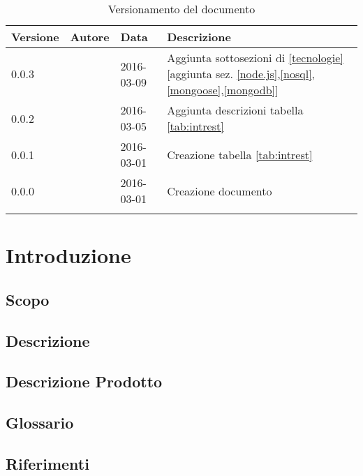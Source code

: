 \documentclass[12pt,a4paper]{article}
\begin{document}
\begin{center}
	\begin{longtable}[H]{p{} p{} p{} p{}}
		\toprule
		\textbf{Versione}	&	\textbf{Autore}	&	\textbf{Data}	&	\textbf{Descrizione}\\*
		\midrule
		\midrule
		0.0.3 & \AVE{} & 2016-03-09 & Aggiunta sottosezioni di \ref{tecnologie} [aggiunta sez. \ref{node.js},\ref{nosql},\ref{mongoose},\ref{mongodb}]  \\*
		\midrule
		0.0.2 & \AVI{} & 2016-03-05 &  Aggiunta descrizioni tabella \ref{tab:intrest} \\*
		\midrule
		0.0.1 & \NDC{} & 2016-03-01 &  Creazione tabella \ref{tab:intrest} \\*
		\midrule
		0.0.0 & \NDC{} & 2016-03-01 &  Creazione documento \\*
		\bottomrule
		\caption{Versionamento del documento}
		\label{tabVers1} 
	\end{longtable}
\end{center}

\newpage
\tableofcontents
\newpage
\listoftables
\listoffigures
\newpage

\section{Introduzione}

\subsection{Scopo}


\subsection{Descrizione}


\subsection{Descrizione Prodotto}
\descrizioneProdotto

\subsection{Glossario}\label{glossario}
\glossarioPrint

\subsection{Riferimenti}\label{riferimenti}
\end{document}
